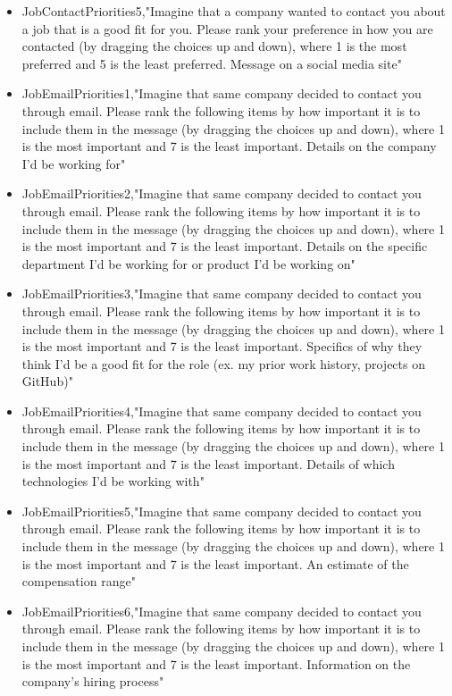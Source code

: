 \begin{appendices}
\begin{itemize}
        \item JobContactPriorities5,"Imagine that a company wanted to contact you about a job that is a good fit for you. Please rank your preference in how you are contacted (by dragging the choices up and down), where 1 is the most preferred and 5 is the least preferred. Message on a social media site"
        \item JobEmailPriorities1,"Imagine that same company decided to contact you through email. Please rank the following items by how important it is to include them in the message (by dragging the choices up and down), where 1 is the most important and 7 is the least important. Details on the company I'd be working for"
        \item JobEmailPriorities2,"Imagine that same company decided to contact you through email. Please rank the following items by how important it is to include them in the message (by dragging the choices up and down), where 1 is the most important and 7 is the least important. Details on the specific department I'd be working for or product I'd be working on"
        \item JobEmailPriorities3,"Imagine that same company decided to contact you through email. Please rank the following items by how important it is to include them in the message (by dragging the choices up and down), where 1 is the most important and 7 is the least important. Specifics of why they think I'd be a good fit for the role (ex. my prior work history, projects on GitHub)"
        \item JobEmailPriorities4,"Imagine that same company decided to contact you through email. Please rank the following items by how important it is to include them in the message (by dragging the choices up and down), where 1 is the most important and 7 is the least important. Details of which technologies I'd be working with"
        \item JobEmailPriorities5,"Imagine that same company decided to contact you through email. Please rank the following items by how important it is to include them in the message (by dragging the choices up and down), where 1 is the most important and 7 is the least important. An estimate of the compensation range"
        \item JobEmailPriorities6,"Imagine that same company decided to contact you through email. Please rank the following items by how important it is to include them in the message (by dragging the choices up and down), where 1 is the most important and 7 is the least important. Information on the company's hiring process"

\end{itemize}
\end{appendices}
